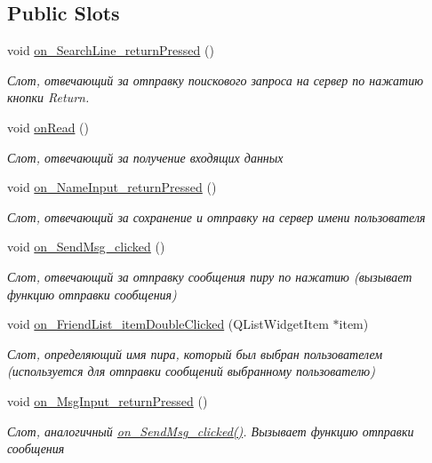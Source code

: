 \subsection*{Public Slots}
\begin{DoxyCompactItemize}
\item 
void \hyperlink{class_client_window_a09a50177ec2bfc59fc9ec8f698153111}{on\+\_\+\+Search\+Line\+\_\+return\+Pressed} ()
\begin{DoxyCompactList}\small\item\em Слот, отвечающий за отправку поискового запроса на сервер по нажатию кнопки Return. \end{DoxyCompactList}\item 
void \hyperlink{class_client_window_a6af59313228995e6c55d265db7ce3995}{on\+Read} ()
\begin{DoxyCompactList}\small\item\em Слот, отвечающий за получение входящих данных \end{DoxyCompactList}\item 
void \hyperlink{class_client_window_ac2bce105ea893651dc9daf567bb966b5}{on\+\_\+\+Name\+Input\+\_\+return\+Pressed} ()
\begin{DoxyCompactList}\small\item\em Слот, отвечающий за сохранение и отправку на сервер имени пользователя \end{DoxyCompactList}\item 
void \hyperlink{class_client_window_a3868f97e58d97ea716137c52e50b968d}{on\+\_\+\+Send\+Msg\+\_\+clicked} ()
\begin{DoxyCompactList}\small\item\em Слот, отвечающий за отправку сообщения пиру по нажатию (вызывает функцию отправки сообщения) \end{DoxyCompactList}\item 
void \hyperlink{class_client_window_a53683c81555a53e513066619a66bdbf4}{on\+\_\+\+Friend\+List\+\_\+item\+Double\+Clicked} (Q\+List\+Widget\+Item $\ast$item)
\begin{DoxyCompactList}\small\item\em Слот, определяющий имя пира, который был выбран пользователем (используется для отправки сообщений выбранному пользователю) \end{DoxyCompactList}\item 
void \hyperlink{class_client_window_a201f45c14dfb71277f628ea6607d2959}{on\+\_\+\+Msg\+Input\+\_\+return\+Pressed} ()
\begin{DoxyCompactList}\small\item\em Слот, аналогичный \hyperlink{class_client_window_a3868f97e58d97ea716137c52e50b968d}{on\+\_\+\+Send\+Msg\+\_\+clicked()}. Вызывает функцию отправки сообщения \end{DoxyCompactList}\item 

\end{DoxyCompactItemize}
